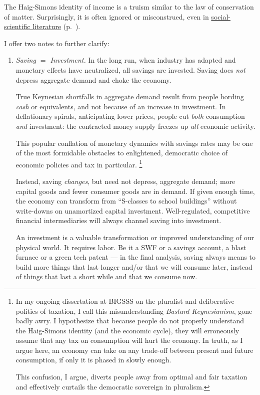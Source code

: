 The Haig-Simons identity of income is a truism similar to the law of conservation of matter.
Surprisingly, it is often ignored or misconstrued, even in \hyperref[sec:Literature]{social-scientific literature} (p.~\pageref{sec:Literature}).

I offer two notes to further clarify:
\begin{enumerate}
	\item \emph{Saving $=$ Investment.}
	In the long run, when industry has adapted and monetary effects have neutralized, all savings are invested.
	Saving does \emph{not} depress aggregate demand and choke the economy.

	True Keynesian shortfalls in aggregate demand result from people hording \emph{cash} or equivalents, and not because of an increase in investment.
	In deflationary spirals, anticipating lower prices, people cut \emph{both} consumption \emph{and} investment:
	the contracted money supply freezes up \emph{all} economic activity.

	This popular conflation of monetary dynamics with savings rates may be one of the most formidable obstacles to enlightened, democratic choice of economic policies and tax in particular.
	\footnote{
		In my ongoing dissertation at \gls{BIGSSS} on the pluralist and deliberative politics of taxation, I call this misunderstanding \emph{Bastard Keynesianism}, gone badly awry.
		I hypothesize that because people do not properly understand the Haig-Simons identity (and the economic cycle), they will erroneously assume that any tax on consumption will hurt the economy.
		In truth, as I argue here, an economy can take on any trade-off between present and future consumption, if only it is phased in slowly enough.

		This confusion, I argue, diverts people away from optimal and fair taxation and effectively curtails the democratic sovereign in pluralism.
	}

	Instead, saving \emph{changes}, but need not depress, aggregate demand;
	more capital goods and fewer consumer goods are in demand.
	If given enough time, the economy can transform from ``S-classes to school buildings'' without write-downs on unamortized capital investment.
	Well-regulated, competitive financial intermediaries will always channel saving into investment.

	An investment is a valuable transformation or improved understanding of our physical world.
	It requires labor.
	Be it a \gls{SWF} or a savings account, a blast furnace or a green tech patent --- in the final analysis, saving always means to build more things that last longer and/or that we will consume later, instead of things that last a short while and that we consume now.


\end{enumerate}
